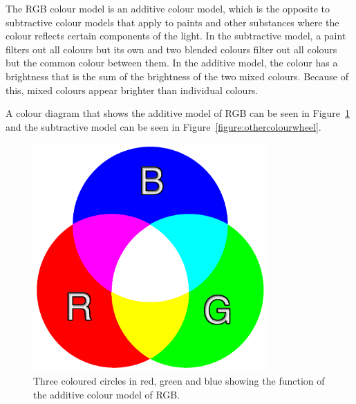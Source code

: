 \documentclass[../MasterThesis.tex]{subfiles}
\begin{document}
The RGB colour model is an additive colour model, which is the opposite to subtractive colour models that apply to paints and other substances where the colour reflects certain components of the light. 
In the subtractive model, a paint filters out all colours but its own and two blended colours filter out all colours but the common colour between them. In the additive model, the colour has a brightness that is the sum of the brightness of the two mixed colours. Because of this, mixed colours appear brighter than individual colours.~\cite{colourRGB}

A colour diagram that shows the additive model of RGB can be seen in Figure~\ref{figure:RGB} and the subtractive model can be seen in Figure~\ref{figure:othercolourwheel}.


\begin{minipage}{0.48\textwidth}
	\begin{figure}[H]
		
		\centering
		
		\includegraphics[width=0.8\textwidth]{RGB.png}
		
		\caption[Additive colour model of RGB]{Three coloured circles in red, green and blue showing the function of the additive colour model of RGB.}
		\label{figure:RGB}
		
	\end{figure}
\end{minipage}\begin{minipage}{0.04\textwidth}
\ 
\end{minipage}\begin{minipage}{0.48\textwidth}
\begin{figure}[H]
	

\end{figure}
\end{minipage}
\end{document}

